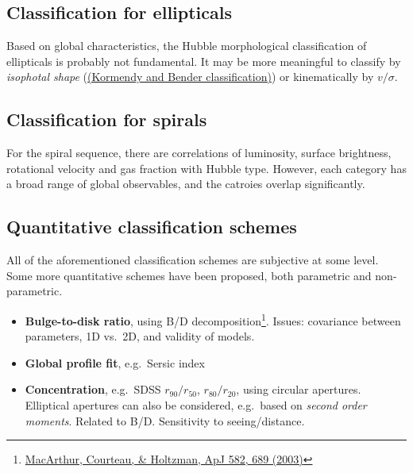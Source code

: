 \documentclass{article}
\begin{document}
\subsection{Classification for ellipticals}
Based on global characteristics, the Hubble morphological classification of
ellipticals is probably not fundamental.  It may be more meaningful to classify
by \emph{isophotal shape}
(\href{http://astronomy.as.virginia.edu}{(Kormendy and Bender classification)})
or kinematically by $v/\sigma$.

\subsection{Classification for spirals}
For the spiral sequence, there are correlations of luminosity, surface
brightness, rotational velocity and gas fraction with Hubble type. However,
each category has a broad range of global observables, and the catroies overlap
significantly.

\subsection{Quantitative classification schemes}
All of the aforementioned classification schemes are subjective at some level.
Some more quantitative schemes have been proposed, both parametric and
non-parametric.
\begin{itemize}
    \item \textbf{Bulge-to-disk ratio}, using B/D decomposition\footnote{
        \href{http://adsabs.harvard.edu/cgi-bin/nph-bib_query?bibcode=2003ApJ...582..689}
        {MacArthur, Courteau, \& Holtzman, ApJ 582, 689 (2003)}}.
        Issues: covariance between parameters, 1D vs.\ 2D, and validity of models.
    \item \textbf{Global profile fit}, e.g.\ Sersic index
    \item \textbf{Concentration}, e.g.\ SDSS $r_{90}/r_{50}$, $r_{80}/r_{20}$,
        using circular apertures. Elliptical apertures can also be considered,
        e.g.\ based on \emph{second order moments}.
        Related to B/D. Sensitivity to seeing/distance.
\end{itemize}
\end{document}
